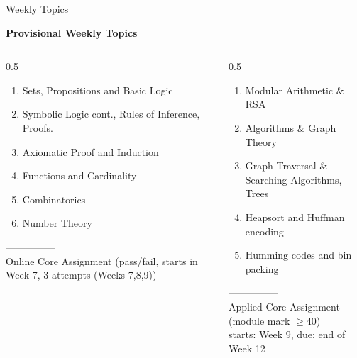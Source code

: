 \documentclass[11pt,aspectratio=1610]{beamer}
\begin{document}
	\begin{frame}{Weekly Topics}
		
		
		\textbf{\large Provisional Weekly Topics}
		
		\begin{columns}		
			\begin{column}{0.5\linewidth}
				\begin{enumerate}\itemsep3mm
					\item Sets, Propositions and Basic Logic
					\item Symbolic Logic cont., Rules of Inference, Proofs.
					\item Axiomatic Proof and Induction
					\item Functions and Cardinality
					\item Combinatorics
					\item Number Theory
				\end{enumerate}	\p
				--------------- \\
				Online Core Assignment (pass/fail, starts in Week 7, 3 attempts (Weeks 7,8,9))	\p	
			\end{column}
			\begin{column}{0.5\linewidth}
				\begin{enumerate}\itemsep4mm
					\setcounter{enumi}{6}
					\item Modular Arithmetic \& RSA
					\item Algorithms \& Graph Theory
					\item Graph Traversal \& Searching Algorithms, Trees
					\item Heapsort and Huffman encoding
					\item Humming codes and bin packing
				\end{enumerate}	\p
				--------------- \\
				Applied Core Assignment (module mark $\ge 40$)\p\\
				starts: Week 9, due: end of Week 12
			\end{column}		
			
		\end{columns}
		
		
		
	\end{frame}
	
\end{document}
